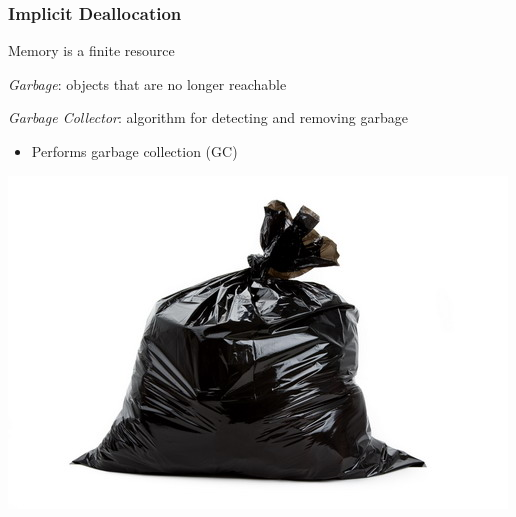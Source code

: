 \documentclass{beamer}
\newcommand{\linespace}{\vskip 0.25cm}
\begin{document}
\begin{frame}

\frametitle{Implicit Deallocation}

Memory is a finite resource

\linespace
\linespace

\emph{Garbage}: objects that are no longer reachable

\linespace
\linespace

\emph{Garbage Collector}: algorithm for detecting and removing garbage
\begin{itemize}
\item Performs garbage collection (GC)
\end{itemize}

\linespace

\begin{center}
\includegraphics[width=.3\textwidth]{Illustrations/garbage.jpg}
\end{center}

\end{frame}
\end{document}
